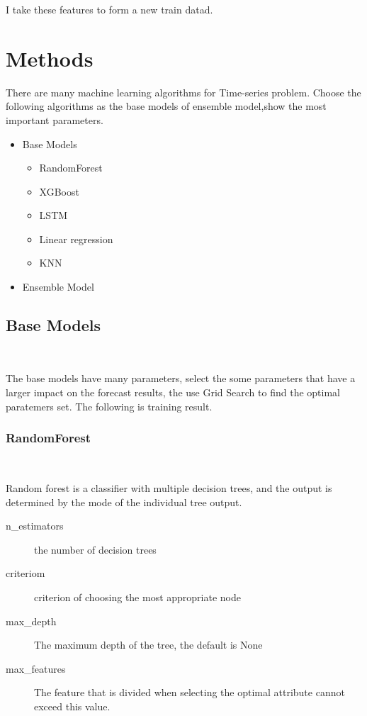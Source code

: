 I take these features 
to form a new train datad.


\section{Methods}

There are many machine learning algorithms 
for Time-series problem. 
Choose the following algorithms
as the base models of ensemble model,show the most important parameters.

\begin{itemize}
    \item Base Models
	\
\begin{itemize}
	\item RandomForest 
	\item XGBoost
	\item LSTM
	\item Linear regression
	\item KNN
\end{itemize}
\item Ensemble Model
\end{itemize}
\subsection{Base Models}
\

The base models have many parameters,
select the some parameters that 
have a larger impact on 
the forecast results,
the use Grid Search to find 
the optimal paratemers set.	
The following is training result. 
\subsubsection{RandomForest}
\

Random forest is a classifier with 
multiple decision trees, and
the output is determined by 
the mode of the individual tree output.


\begin{description}
	\item[n_estimators] the number of decision trees
	\item[criteriom] criterion of choosing 
	the most appropriate node
	\item[max_depth] The maximum depth of the tree, 
	the default is None 
	\item[max_features] The feature that is divided 
	when selecting the optimal attribute 
	cannot exceed this value.
\end{description}
                  
